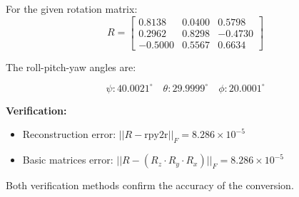 \documentclass[11pt,a4paper]{article}
\begin{document}
For the given rotation matrix:
$$R = \begin{bmatrix}
0.8138 & 0.0400 & 0.5798 \\
0.2962 & 0.8298 & -0.4730 \\
-0.5000 & 0.5567 & 0.6634
\end{bmatrix}$$

The roll-pitch-yaw angles are:

$$\psi: \boxed{40.0021^\circ} \quad \theta: \boxed{29.9999^\circ} \quad \phi: \boxed{20.0001^\circ}$$

\textbf{Verification:}
\begin{itemize}
    \item Reconstruction error: $||R - \text{rpy2r}||_F = 8.286 \times 10^{-5}$
    \item Basic matrices error: $||R - (R_z \cdot R_y \cdot R_x)||_F = 8.286 \times 10^{-5}$
\end{itemize}

Both verification methods confirm the accuracy of the conversion.
\end{document}
